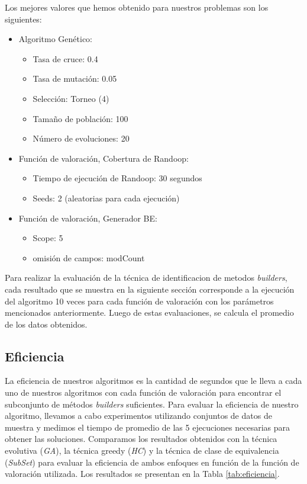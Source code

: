 Los mejores valores que hemos obtenido para nuestros problemas son los siguientes:
\begin{itemize}
    \item Algoritmo Genético:
    \begin{itemize}
        \item Tasa de cruce: 0.4
        \item Tasa de mutación: 0.05
        \item Selección: Torneo (4)
        \item Tamaño de población: 100
        \item Número de evoluciones: 20
    \end{itemize}
    \item Función de valoración, Cobertura de Randoop:
    \begin{itemize}
        \item Tiempo de ejecución de Randoop: 30 segundos
        \item Seeds: 2 (aleatorias para cada ejecución)
    \end{itemize}
     \item Función de valoración, Generador BE:
    \begin{itemize}
        \item Scope: 5
        \item omisión de campos: modCount
    \end{itemize}
\end{itemize}

Para realizar la evaluación de la técnica de identificacion de metodos \emph{builders}, cada resultado que se muestra en la siguiente sección corresponde a la ejecución del algoritmo 10 veces para cada función de valoración con los parámetros mencionados anteriormente. Luego de estas evaluaciones, se calcula el promedio de los datos obtenidos.



\subsection{Eficiencia}
La eficiencia de nuestros algoritmos es la cantidad de segundos que le lleva a cada uno de nuestros algoritmos con cada función de valoración para encontrar el subconjunto de métodos \emph{builders} suficientes. Para evaluar la eficiencia de nuestro algoritmo, llevamos a cabo experimentos utilizando conjuntos de datos de muestra y medimos el tiempo de promedio de las 5 ejecuciones necesarias para obtener las soluciones. Comparamos los resultados obtenidos con la técnica evolutiva (\emph{GA}), la técnica greedy (\emph{HC}) y la técnica de clase de equivalencia (\emph{SubSet}) para evaluar la eficiencia de ambos enfoques en función de la función de valoración utilizada. Los resultados se presentan en la Tabla \ref{tab:eficiencia}.


